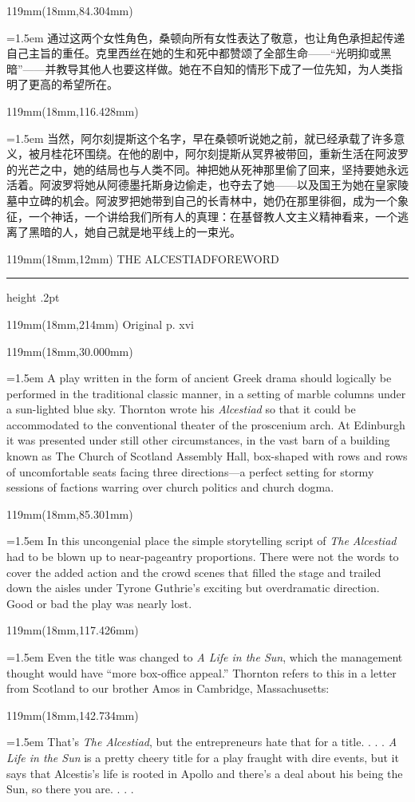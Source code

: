 \documentclass{article}
\newcommand{\ENsetup}{\normalfont\color{ink}\fontsize{11}{16.5}\selectfont\emergencystretch=1.5em}
\newcommand{\ZHsetup}{\normalfont\color{ink}\fontsize{10.5}{17}\selectfont\emergencystretch=1.5em}
\newcommand{\Block}[3]{\begin{textblock*}{119mm}(18mm,#1mm){#2 #3\par}\end{textblock*}}
\newcommand{\Heading}[3]{%
  \begin{textblock*}{119mm}(18mm,12mm)
    \color{quiet}\fontsize{7.5}{10}\selectfont
    #1\hfill #2\par\vspace{3mm}\hrule height .2pt
  \end{textblock*}
  \begin{textblock*}{119mm}(18mm,214mm)
    \color{quiet}\fontsize{7}{10}\selectfont #3\hfill\thepage
  \end{textblock*}
}
\begin{document}
\Block{84.304}{\ZHsetup}{通过这两个女性角色，桑顿向所有女性表达了敬意，也让角色承担起传递自己主旨的重任。克里西丝在她的生和死中都赞颂了全部生命——“光明抑或黑暗”——并教导其他人也要这样做。她在不自知的情形下成了一位先知，为人类指明了更高的希望所在。\par }
\Block{116.428}{\ZHsetup}{当然，阿尔刻提斯这个名字，早在桑顿听说她之前，就已经承载了许多意义，被月桂花环围绕。在他的剧中，阿尔刻提斯从冥界被带回，重新生活在阿波罗的光芒之中，她的结局也与人类不同。神把她从死神那里偷了回来，坚持要她永远活着。阿波罗将她从阿德墨托斯身边偷走，也夺去了她——以及国王为她在皇家陵墓中立碑的机会。阿波罗把她带到自己的长青林中，她仍在那里徘徊，成为一个象征，一个神话，一个讲给我们所有人的真理：在基督教人文主义精神看来，一个逃离了黑暗的人，她自己就是地平线上的一束光。\par }
\newpage
\null
\Heading{THE ALCESTIAD}{FOREWORD}{Original p. xvi}
\Block{30.000}{\ENsetup}{A play written in the form of ancient Greek drama should logically be performed in the traditional classic manner, in a setting of marble columns under a sun-lighted blue sky. Thornton wrote his \textit{Alcestiad} so that it could be accommodated to the conventional theater of the proscenium arch. At Edinburgh it was presented under still other circumstances, in the vast barn of a building known as The Church of Scotland Assembly Hall, box-shaped with rows and rows of uncomfortable seats facing three directions—a perfect setting for stormy sessions of factions warring over church politics and church dogma.\par}
\Block{85.301}{\ENsetup}{In this uncongenial place the simple storytelling script of \textit{The Alcestiad} had to be blown up to near-pageantry proportions. There were not the words to cover the added action and the crowd scenes that filled the stage and trailed down the aisles under Tyrone Guthrie's exciting but overdramatic direction. Good or bad the play was nearly lost.\par}
\Block{117.426}{\ENsetup}{Even the title was changed to \textit{A Life in the Sun}, which the management thought would have ``more box-office appeal.'' Thornton refers to this in a letter from Scotland to our brother Amos in Cambridge, Massachusetts:\par}
\Block{142.734}{\ENsetup}{\leftskip=4mm\rightskip=3mm 
That's \textit{The Alcestiad}, but the entrepreneurs hate that for a title. . . . \textit{A Life in the Sun} is a pretty cheery title for a play fraught with dire events, but it says that Alcestis's life is rooted in Apollo and there's a deal about his being the Sun, so there you are. . . .\par}
\end{document}
